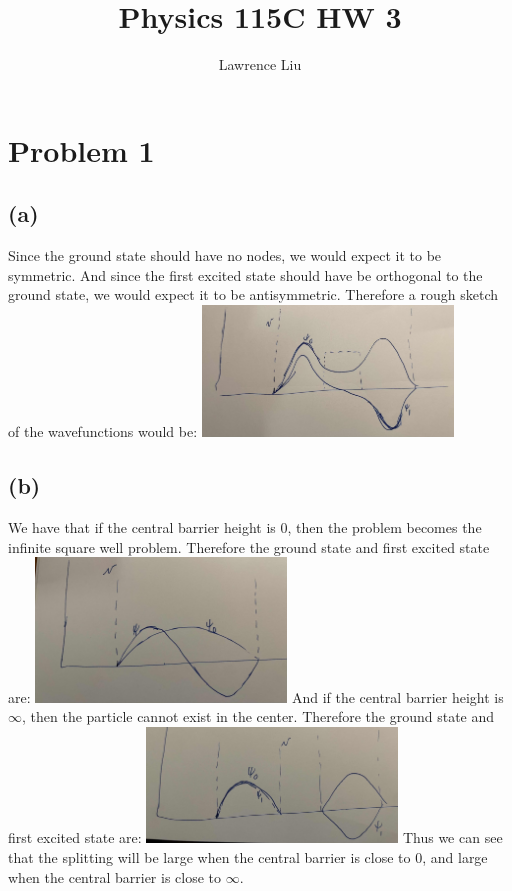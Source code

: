 \documentclass[11pt]{article}
\author{Lawrence Liu}
\title{Physics 115C HW 3}
\begin{document}
\maketitle
\section*{Problem 1}
\subsection*{(a)}
Since the ground state should have no nodes, we would expect it to be 
symmetric. And since the first excited state should have 
be orthogonal to the ground state, we would expect it to be antisymmetric.
Therefore a rough sketch of the wavefunctions would be:
    \includegraphics[width=0.5\textwidth]{prob1a.png}
\subsection*{(b)}
We have that if the central barrier height is $0$, then the problem becomes the 
infinite square well problem. Therefore the ground state and first excited state
are:
\includegraphics*[width=0.5\textwidth]{prob1b1.png}
And if the central barrier height is $\infty$, then the particle cannot exist in the 
center. Therefore the ground state and first excited state are:
\includegraphics*[width=0.5\textwidth]{prob1b2.png}
Thus we can see that the splitting will be large when the central barrier is close to $0$, and 
large when the central barrier is close to $\infty$.
\end{document}
